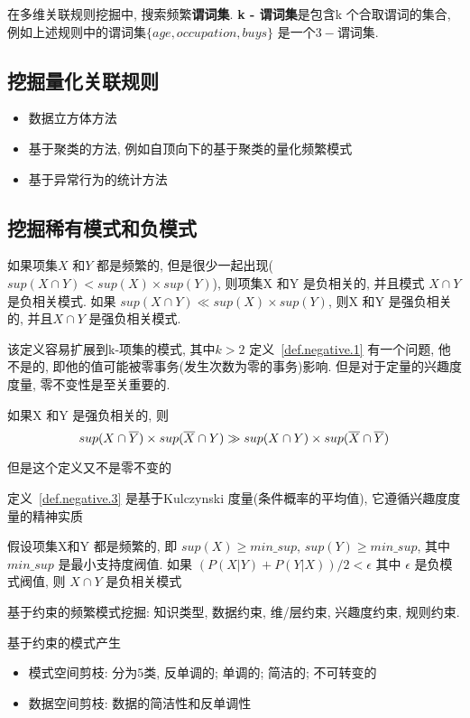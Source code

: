 \documentclass{article}
\begin{document}
在多维关联规则挖掘中, 搜索频繁\textbf{谓词集}. \textbf{k - 谓词集}是包含k 个合取谓词的集合, 例如上述规则中的谓词集$\{age, occupation, buys\}$ 是一个$3-$谓词集.

\subsection{挖掘量化关联规则}
\begin{itemize}
	\item 数据立方体方法
	\item 基于聚类的方法, 例如自顶向下的基于聚类的量化频繁模式
	\item 基于异常行为的统计方法
\end{itemize}

\subsection{挖掘稀有模式和负模式}
\begin{definition}
\label{def.negative.1}
如果项集$X$ 和$Y$ 都是频繁的, 但是很少一起出现($sup(X \cap Y) < sup(X) \times sup(Y)$), 则项集X 和Y 是负相关的, 并且模式 $X \cap Y$ 是负相关模式. 如果
$sup(X \cap Y) \ll sup(X) \times sup(Y)$, 则X 和Y 是强负相关的, 并且$X \cap Y$ 是强负相关模式.
\end{definition}
该定义容易扩展到k-项集的模式, 其中$k>2$
定义~\ref{def.negative.1} 有一个问题, 他不是的, 即他的值可能被零事务(发生次数为零的事务)影响. 但是对于定量的兴趣度度量, 零不变性是至关重要的.

\begin{definition}
如果X 和Y 是强负相关的, 则
$$
sup(X \cap \overline{Y}) \times sup(\overline{X} \cap Y) \gg sup(X \cap Y) \times sup(\overline{X} \cap \overline{Y})
$$	
\end{definition}
但是这个定义又不是零不变的

定义~\ref{def.negative.3} 是基于Kulczynski 度量(条件概率的平均值), 它遵循兴趣度度量的精神实质
\begin{definition}
\label{def.negative.3}
假设项集X和Y 都是频繁的, 即
$sup(X) \geq min\_sup$,
$sup(Y) \geq min\_sup$,
其中$min\_sup$ 是最小支持度阀值.
如果 $ (P(X| Y) + P(Y|X))/2 < \epsilon $
其中 $\epsilon$ 是负模式阀值, 则 $X \cap Y$ 是负相关模式
\end{definition}

基于约束的频繁模式挖掘: 
知识类型,
数据约束,
维/层约束,
兴趣度约束,
规则约束.

基于约束的模式产生
\begin{itemize}
	\item 模式空间剪枝: 分为5类, 反单调的; 单调的; 简洁的; 不可转变的
	\item 数据空间剪枝: 数据的简洁性和反单调性
\end{itemize}
\end{document}
